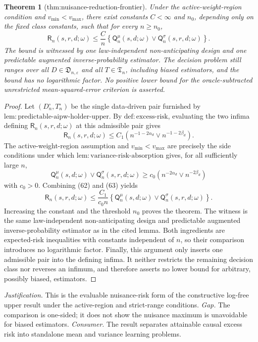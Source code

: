 \documentclass{article}
\newtheorem{theorem}{Theorem}
\begin{document}
\begin{theorem}[thm:nuisance-reduction-frontier]\label{thm:nuisance-reduction-frontier}
Under the active-weight-region condition and \(v_{\min}<v_{\max}\), there exist constants \(C<\infty\) and \(n_0\), depending only on the fixed class constants, such that for every \(n\geq n_0\),
\[
\mathsf R_n(s,r,d;\omega)
\leq \frac{C}{n}\left\{\mathsf Q_n^{\mu}(s,d;\omega)\vee
\mathsf Q_n^{\sigma}(s,r,d;\omega)\right\}.
\]
The bound is witnessed by one law-independent non-anticipating design and one predictable augmented inverse-probability estimator.  The decision problem still ranges over all \(D\in\mathfrak D_{n,\varepsilon}\) and all \(T\in\mathfrak T_n\), including biased estimators, and the bound has no logarithmic factor.  No positive lower bound for the oracle-subtracted unrestricted mean-squared-error criterion is asserted.
\end{theorem}
\begin{proof}
Let \((D_n^{\circ},T_n^{\circ})\) be the single data-driven pair furnished by \(\mathrm{lem{:}predictable\text{-}aipw\text{-}holder\text{-}upper}\). By \(\mathrm{def{:}excess\text{-}risk}\), evaluating the two infima defining \(\mathsf R_n(s,r,d;\omega)\) at this admissible pair gives
\[
\mathsf R_n(s,r,d;\omega)
\leq C_1\left(n^{-1-2\alpha_d}\vee n^{-1-2\beta_d}\right).
\tag{62}
\]
The active-weight-region assumption and \(v_{\min}<v_{\max}\) are precisely the side conditions under which \(\mathrm{lem{:}variance\text{-}risk\text{-}absorption}\) gives, for all sufficiently large \(n\),
\[
\mathsf Q_n^{\mu}(s,d;\omega)\vee
\mathsf Q_n^{\sigma}(s,r,d;\omega)
\geq c_0\left(n^{-2\alpha_d}\vee n^{-2\beta_d}\right)
\tag{63}
\]
with \(c_0>0\). Combining (62) and (63) yields
\[
\mathsf R_n(s,r,d;\omega)
\leq \frac{C_1}{c_0n}
\left\{\mathsf Q_n^{\mu}(s,d;\omega)\vee
\mathsf Q_n^{\sigma}(s,r,d;\omega)\right\}.
\]
Increasing the constant and the threshold \(n_0\) proves the theorem. The witness is the same law-independent non-anticipating design and predictable augmented inverse-probability estimator as in the cited lemma. Both ingredients are expected-risk inequalities with constants independent of \(n\), so their comparison introduces no logarithmic factor. Finally, this argument only inserts one admissible pair into the defining infima. It neither restricts the remaining decision class nor reverses an infimum, and therefore asserts no lower bound for arbitrary, possibly biased, estimators.
\end{proof}
\par\smallskip\noindent \textit{Justification.} This is the evaluable nuisance-risk form of the constructive log-free upper result under the active-region and strict-range conditions. \textit{Gap.} The comparison is one-sided; it does not show the nuisance maximum is unavoidable for biased estimators. \textit{Consumer.} The result separates attainable causal excess risk into standalone mean and variance learning problems.
\end{document}

